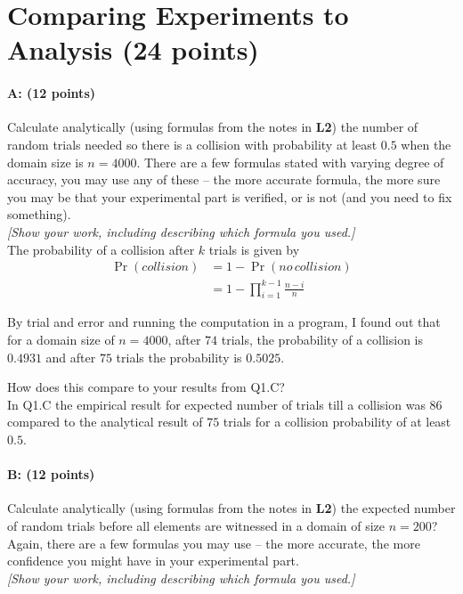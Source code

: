 \documentclass[11pt]{article}
\begin{document}
\section{Comparing Experiments to Analysis (24 points)}

\paragraph{A: (12 points)}
Calculate analytically (using formulas from the notes in \textbf{L2}) the number of random trials needed so there is a collision with probability at least $0.5$ when the domain size is $n = 4000$.  There are a few formulas stated with varying degree of accuracy, you may use any of these -- the more accurate formula, the more sure you may be that your experimental part is verified, or is not (and you need to fix something).  
\\ \emph{[Show your work, including describing which formula you used.]}\\

The probability of a collision after $k$ trials is given by\\

\begin{equation*}
\begin{aligned}
\Pr(collision) &= 1 - \Pr(no \, collision)\\
&= 1 - \prod_{i=1}^{k-1} \frac{n-i}{n} 
\end{aligned}
\end{equation*}

By trial and error and running the computation in a program, I found out that for a domain size of $n=4000$, after $74$ trials, the probability of a collision is $0.4931$ and after $75$ trials the probability is $0.5025$. 

How does this compare to your results from \textsf{Q1.C}?  \\

In \textsf{Q1.C} the empirical result for expected number of trials till a collision was $86$ compared to the analytical result of $75$ trials for a collision probability of at least $0.5$.

\paragraph{B: (12 points)}
Calculate analytically (using formulas from the notes in \textbf{L2}) the expected number of random trials before all elements are witnessed in a domain of size $n=200$?  Again, there are a few formulas you may use -- the more accurate, the more confidence you might have in your experimental part.  
\\ \emph{[Show your work, including describing which formula you used.]}\\
\end{document}

